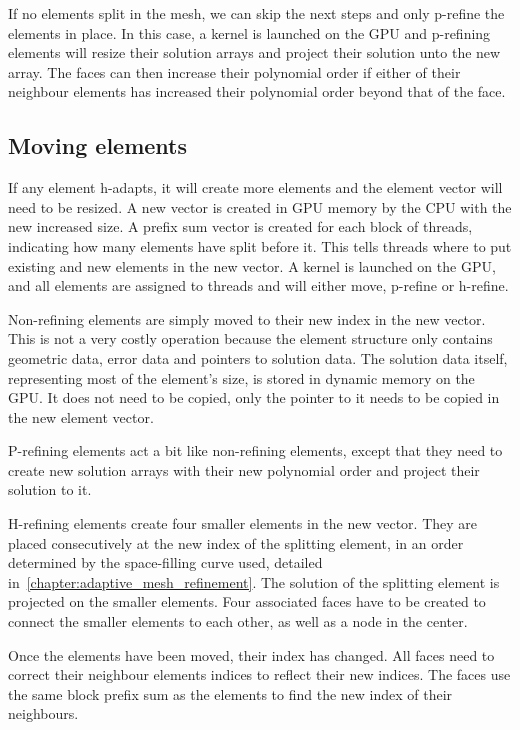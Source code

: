 If no elements split in the mesh, we can skip the next steps and only p-refine the elements in
place. In this case, a kernel is launched on the GPU and p-refining elements will resize their
solution arrays and project their solution unto the new array. The faces can then increase their
polynomial order if either of their neighbour elements has increased their polynomial order beyond
that of the face. 

\subsection{Moving elements} \label{subsection:adaptive_mesh_refinement:implementation:moving_elements}


If any element h-adapts, it will create more elements and the element vector will need to be
resized. A new vector is created in GPU memory by the CPU with the new increased size. A prefix sum
vector is created for each block of threads, indicating how many elements have split before it. This
tells threads where to put existing and new elements in the new vector. A kernel is launched on the
GPU, and all elements are assigned to threads and will either move, p-refine or h-refine.

Non-refining elements are simply moved to their new index in the new vector. This is not a very
costly operation because the element structure only contains geometric data, error data and pointers
to solution data. The solution data itself, representing most of the element's size, is stored in
dynamic memory on the GPU. It does not need to be copied, only the pointer to it needs to be copied
in the new element vector. 

P-refining elements act a bit like non-refining elements, except that they need to create new
solution arrays with their new polynomial order and project their solution to it.

H-refining elements create four smaller elements in the new vector. They are placed consecutively at
the new index of the splitting element, in an order determined by the space-filling curve used,
detailed in~\ref{chapter:adaptive_mesh_refinement}. The solution of the splitting element is
projected on the smaller elements. Four associated faces have to be created to connect the smaller
elements to each other, as well as a node in the center. 

Once the elements have been moved, their index has changed. All faces need to correct their
neighbour elements indices to reflect their new indices. The faces use the same block prefix sum as
the elements to find the new index of their neighbours.

